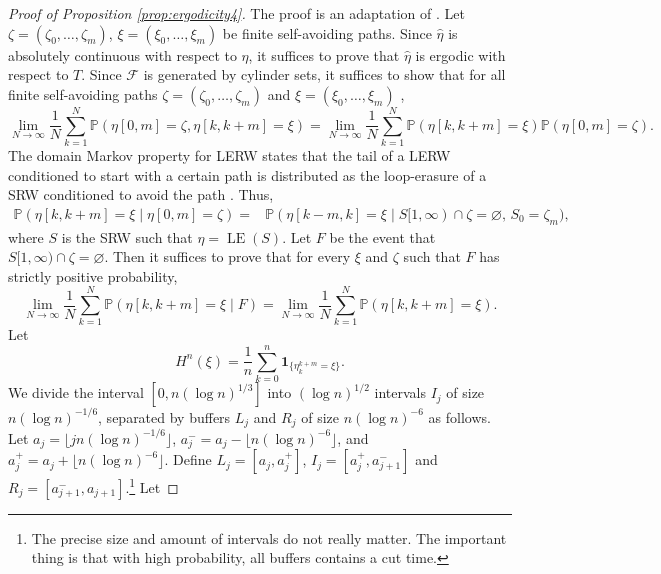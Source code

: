 \documentclass{article}
\DeclareMathOperator{\LE}{LE}
\newcommand{\cF}{\mathcal{F}}
\renewcommand{\P}{\mathbb{P}}
\newcommand{\1}{\mathbf{1}}
\newcommand{\heta}{\hat\eta}
\theoremstyle{definition}
\numberwithin{equation}{section}
\numberwithin{theorem}{section}
\begin{document}
\begin{proof}[Proof of Proposition \ref{prop:ergodicity4}]
The proof is an adaptation of \cite[Proposition 5.9]{lawler80selfavoiding}. Let $\zeta=(\zeta_0,\ldots,\zeta_m)$, $\xi=(\xi_0,\ldots,\xi_{m})$ be finite self-avoiding paths. Since $\heta$ is absolutely continuous with respect to $\eta$, it suffices to prove that $\heta$ is ergodic with respect to $T$. Since $\cF$ is generated by cylinder sets, it suffices to show that for all finite self-avoiding paths $\zeta=(\zeta_0,\ldots,\zeta_m)$ and $\xi=(\xi_0,\ldots,\xi_{m})$ \cite[Lemma 6.7.4]{gray09probability},
\begin{equation}
\lim_{N\rightarrow\infty}\frac{1}{N}\sum_{k=1}^N\P(\eta[0,m]=\zeta,\eta[k,k+m]=\xi)=\lim_{N\rightarrow\infty}\frac{1}{N}\sum_{k=1}^N\P(\eta[k,k+m]=\xi)\P(\eta[0,m]=\zeta).
\end{equation}
The domain Markov property for LERW states that the tail of a LERW conditioned to start with a certain path is distributed as the loop-erasure of a SRW conditioned to avoid the path \cite[Section 7.3]{lawler91intersections}. Thus,
\begin{equation}
    \begin{split}
        \P(\eta[k,k+m]=\xi\mid\eta[0,m]=\zeta)=&\P(\eta[k-m,k]=\xi\mid S[1,\infty)\cap\zeta=\varnothing,\,S_0=\zeta_m),
    \end{split}
\end{equation}
where $S$ is the SRW such that $\eta=\LE(S)$. Let $F$ be the event that $S[1,\infty)\cap\zeta=\varnothing$. Then it suffices to prove that for every $\xi$ and $\zeta$ such that $F$ has strictly positive probability,
\begin{equation}
    \lim_{N\rightarrow\infty}\frac{1}{N}\sum_{k=1}^N\P(\eta[k,k+m]=\xi\mid F)=\lim_{N\rightarrow\infty}\frac{1}{N}\sum_{k=1}^N\P(\eta[k,k+m]=\xi).
\end{equation}
Let
\begin{equation}
    H^n(\xi)=\frac{1}{n}\sum_{k=0}^n\1_{\{\eta_{k}^{k+m}=\xi\}}.
\end{equation}
We divide the interval $[0,n(\log n)^{1/3}]$ into $(\log n)^{1/2}$ intervals $I_j$ of size $n(\log n)^{-1/6}$, separated by buffers $L_j$ and $R_j$ of size $n(\log n)^{-6}$ as follows. Let $a_j=\lfloor jn(\log n)^{-1/6}\rfloor$, $a_j^-=a_j-\lfloor n(\log n)^{-6}\rfloor$, and $a_j^+=a_j+\lfloor n(\log n)^{-6}\rfloor$. Define $L_j=[a_j,a_j^+]$, $I_j=[a_j^+,a_{j+1}^-]$ and $R_j=[a_{j+1}^-,a_{j+1}]$.\footnote{The precise size and amount of intervals do not really matter. The important thing is that with high probability, all buffers contains a cut time.} Let 

\end{proof}
\end{document}
